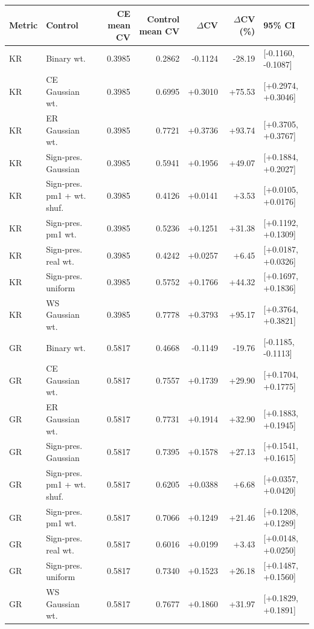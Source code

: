 \begin{tabular}{llrrrrl}
\toprule
Metric & Control & CE mean CV & Control mean CV & $\Delta$CV & $\Delta$CV (\%) & 95\% CI \\
\midrule
KR & Binary wt. & 0.3985 & 0.2862 & -0.1124 & -28.19 & [-0.1160, -0.1087] \\
KR & CE Gaussian wt. & 0.3985 & 0.6995 & +0.3010 & +75.53 & [+0.2974, +0.3046] \\
KR & ER Gaussian wt. & 0.3985 & 0.7721 & +0.3736 & +93.74 & [+0.3705, +0.3767] \\
KR & Sign-pres. Gaussian & 0.3985 & 0.5941 & +0.1956 & +49.07 & [+0.1884, +0.2027] \\
KR & Sign-pres. pm1 + wt. shuf. & 0.3985 & 0.4126 & +0.0141 & +3.53 & [+0.0105, +0.0176] \\
KR & Sign-pres. pm1 wt. & 0.3985 & 0.5236 & +0.1251 & +31.38 & [+0.1192, +0.1309] \\
KR & Sign-pres. real wt. & 0.3985 & 0.4242 & +0.0257 & +6.45 & [+0.0187, +0.0326] \\
KR & Sign-pres. uniform & 0.3985 & 0.5752 & +0.1766 & +44.32 & [+0.1697, +0.1836] \\
KR & WS Gaussian wt. & 0.3985 & 0.7778 & +0.3793 & +95.17 & [+0.3764, +0.3821] \\
GR & Binary wt. & 0.5817 & 0.4668 & -0.1149 & -19.76 & [-0.1185, -0.1113] \\
GR & CE Gaussian wt. & 0.5817 & 0.7557 & +0.1739 & +29.90 & [+0.1704, +0.1775] \\
GR & ER Gaussian wt. & 0.5817 & 0.7731 & +0.1914 & +32.90 & [+0.1883, +0.1945] \\
GR & Sign-pres. Gaussian & 0.5817 & 0.7395 & +0.1578 & +27.13 & [+0.1541, +0.1615] \\
GR & Sign-pres. pm1 + wt. shuf. & 0.5817 & 0.6205 & +0.0388 & +6.68 & [+0.0357, +0.0420] \\
GR & Sign-pres. pm1 wt. & 0.5817 & 0.7066 & +0.1249 & +21.46 & [+0.1208, +0.1289] \\
GR & Sign-pres. real wt. & 0.5817 & 0.6016 & +0.0199 & +3.43 & [+0.0148, +0.0250] \\
GR & Sign-pres. uniform & 0.5817 & 0.7340 & +0.1523 & +26.18 & [+0.1487, +0.1560] \\
GR & WS Gaussian wt. & 0.5817 & 0.7677 & +0.1860 & +31.97 & [+0.1829, +0.1891] \\
\bottomrule
\end{tabular}
